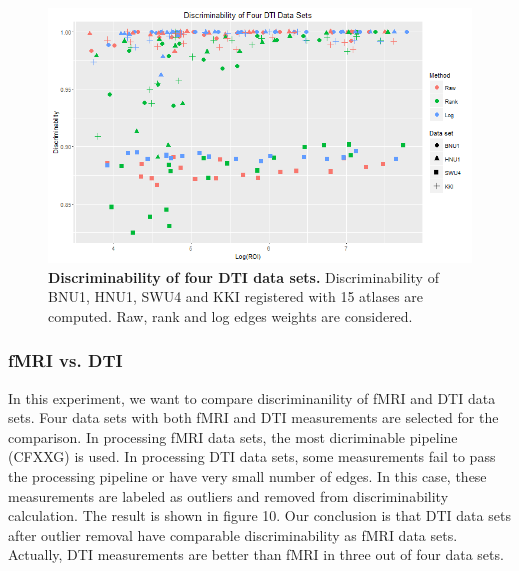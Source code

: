 \documentclass{article}
\begin{document}
\begin{figure}[ht!]
	\includegraphics[width=\linewidth]{../Figs/four_dti.png}
	\caption{{ \bf Discriminability of four DTI data sets.} Discriminability of BNU1, HNU1, SWU4 and KKI registered with 15 atlases are computed. Raw, rank and log edges weights are considered. }
	\label{fig:7}
\end{figure}

\subsubsection{fMRI vs. DTI}
In this experiment, we want to compare discriminanility of fMRI and DTI data sets. Four data sets with both fMRI and DTI measurements are selected for the comparison. In processing fMRI data sets, the most dicriminable pipeline (CFXXG) is used. In processing DTI data sets, some measurements fail to pass the processing pipeline or have very small number of edges. In this case, these measurements are labeled as outliers and removed from discriminability calculation. The result is shown in figure 10. Our conclusion is that DTI data sets after outlier removal have comparable discriminability as fMRI data sets. Actually, DTI measurements are better than fMRI in three out of four data sets. 
\end{document}
